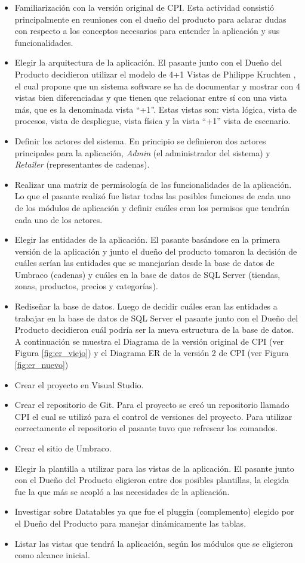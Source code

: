 \begin{itemize}
  \item Familiarización con la versión original de CPI. Esta actividad consistió principalmente en reuniones con el dueño del producto para aclarar dudas con respecto a los conceptos necesarios para entender la aplicación y sus funcionalidades.
  \item Elegir la arquitectura de la aplicación. El pasante junto con el Dueño del Producto decidieron utilizar el modelo de 4+1 Vistas de Philippe Kruchten \cite{vistasKruchten}, el cual  propone que un sistema software se ha de documentar y mostrar con 4 vistas bien diferenciadas y que tienen que relacionar entre sí con una vista más, que es la denominada vista “+1”. Estas vistas son: vista lógica, vista de procesos, vista de despliegue, vista física y la vista “+1” vista de escenario.
  \item Definir los actores del sistema. En principio se definieron dos actores principales para la aplicación, \textit{Admin} (el administrador del sistema) y \textit{Retailer} (representantes de cadenas).
  \item Realizar una matriz de permisología de las funcionalidades de la aplicación. Lo que el pasante realizó fue listar todas las posibles funciones de cada uno de los módulos de aplicación y definir cuáles eran los permisos que tendrán cada uno de los actores.
  \item Elegir las entidades de la aplicación. El pasante basándose en la primera versión de la aplicación y junto el dueño del producto tomaron la decisión de cuáles serían las entidades que se manejarían desde la base de datos de Umbraco (cadenas) y cuáles en la base de datos de SQL Server (tiendas, zonas, productos, precios y categorías).
  \item Rediseñar la base de datos. Luego de decidir cuáles eran las entidades a trabajar en la base de datos de SQL Server el pasante junto con el Dueño del Producto decidieron cuál podría ser la nueva estructura de la base de datos. A continuación se muestra el Diagrama de la versión original de CPI (ver Figura \ref{fig:er_viejo}) y el Diagrama ER de la versión 2 de CPI (ver Figura \ref{fig:er_nuevo})
  \item Crear el proyecto en Visual Studio. 
  \item Crear el repositorio de Git. Para el proyecto se creó un repositorio llamado CPI el cual se utilizó para el control de versiones del proyecto. Para utilizar correctamente el repositorio el pasante tuvo que refrescar los comandos.
  \item Crear el sitio de Umbraco.
  \item Elegir la plantilla a utilizar para las vistas de la aplicación. El pasante junto con el Dueño del Producto eligieron entre dos posibles plantillas, la elegida fue la que más se acopló a las necesidades de la aplicación.
  \item Investigar sobre Datatables ya que fue el pluggin (complemento) elegido por el Dueño del Producto para manejar dinámicamente las tablas.
  \item Listar las vistas que tendrá la aplicación, según los módulos que se eligieron como alcance inicial.
\end{itemize}

